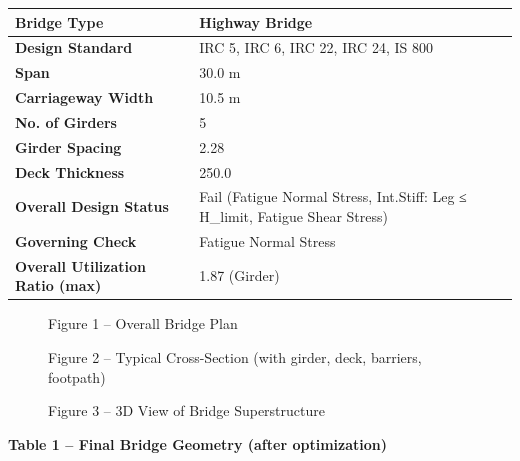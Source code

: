 \documentclass[12pt,a4paper]{report}
\numberwithin{table}{chapter}
\numberwithin{figure}{chapter}
\begin{document}
\begin{tabular}{|L{5.5cm}|L{8.5cm}|}
\hline
\textbf{Bridge Type} & Highway Bridge \\
\hline
\textbf{Design Standard} & IRC 5, IRC 6, IRC 22, IRC 24, IS 800 \\
\hline
\textbf{Span} & 30.0 m \\
\hline
\textbf{Carriageway Width} & 10.5 m \\
\hline
\textbf{No. of Girders} & 5 \\
\hline
\textbf{Girder Spacing} & 2.28 \\
\hline
\textbf{Deck Thickness} & 250.0 \\
\hline
\textbf{Overall Design Status} & Fail (Fatigue Normal Stress, Int.Stiff:\allowbreak{} Leg ≤ H\_\allowbreak{}limit, Fatigue Shear Stress) \\
\hline
\textbf{Governing Check} & Fatigue Normal Stress \\
\hline
\textbf{Overall Utilization Ratio (max)} & 1.87 (Girder) \\
\hline
\end{tabular}


\begin{figure}[H]
\centering
{}
\caption*{Figure 1 -- Overall Bridge Plan}
\end{figure}

\newpage

\begin{figure}[H]
\centering
{}
\caption*{Figure 2 -- Typical Cross-Section (with girder, deck, barriers, footpath)}
\end{figure}

\begin{figure}[H]
\centering
{}
\caption*{Figure 3 -- 3D View of Bridge Superstructure}
\end{figure}

\noindent\textbf{Table 1 -- Final Bridge Geometry (after optimization)}
\end{document}
